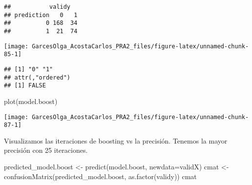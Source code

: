 \documentclass[
]{article}
\newenvironment{Shaded}{\begin{snugshade}}{\end{snugshade}}
\newcommand{\DataTypeTok}[1]{\textcolor[rgb]{0.87,0.87,0.75}{#1}}
\newcommand{\KeywordTok}[1]{\textcolor[rgb]{0.94,0.87,0.69}{#1}}
\newcommand{\NormalTok}[1]{\textcolor[rgb]{0.80,0.80,0.80}{#1}}
\newcommand{\OperatorTok}[1]{\textcolor[rgb]{0.94,0.94,0.82}{#1}}
\newcommand{\StringTok}[1]{\textcolor[rgb]{0.80,0.58,0.58}{#1}}
\begin{document}
\begin{verbatim}
##           validy
## prediction   0   1
##          0 168  34
##          1  21  74
\end{verbatim}

\begin{Shaded}
\end{Shaded}

\begin{center}\texttt{[image: GarcesOlga\_AcostaCarlos\_PRA2\_files/figure-latex/unnamed-chunk-85-1]} \end{center}

\begin{Shaded}
\end{Shaded}

\begin{verbatim}
## [1] "0" "1"
## attr(,"ordered")
## [1] FALSE
\end{verbatim}

\begin{Shaded}
\begin{Highlighting}[]
\KeywordTok{plot}\NormalTok{(model.boost)}
\end{Highlighting}
\end{Shaded}

\begin{center}\texttt{[image: GarcesOlga\_AcostaCarlos\_PRA2\_files/figure-latex/unnamed-chunk-87-1]} \end{center}

Visualizamos las iteraciones de boosting vs la precisión. Tenemos la
mayor precisión con 25 iteraciones.

\begin{Shaded}
\begin{Highlighting}[]
\NormalTok{predicted_model.boost <-}\StringTok{ }\KeywordTok{predict}\NormalTok{(model.boost, }\DataTypeTok{newdata=}\NormalTok{validX)}
\NormalTok{cmat <-}\StringTok{ }\KeywordTok{confusionMatrix}\NormalTok{(predicted_model.boost, }\KeywordTok{as.factor}\NormalTok{(validy))}
\NormalTok{cmat}
\end{Highlighting}
\end{Shaded}
\end{document}
